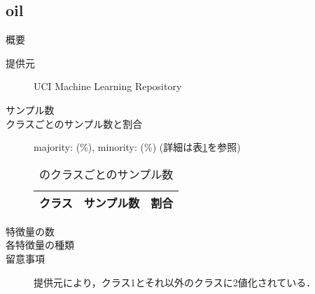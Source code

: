 \subsection{oil}
\begin{description}
    \item[概要] \cite{}
    \item[提供元] UCI Machine Learning Repository
    \item[サンプル数] 
    \item[クラスごとのサンプル数と割合] majority:  (\%), minority:  (\%) (詳細は表\ref{tab:}を参照)

        \begin{table}[htbp]
            \centering
            \caption{のクラスごとのサンプル数}
            \label{tab:}
            \begin{tabular}{lrc} \hline
                \multicolumn{1}{c}{クラス}&
                \multicolumn{1}{c}{サンプル数}&
                \multicolumn{1}{c}{割合}\\
                \hline
                \hline

                \hline
            \end{tabular}
        \end{table}

    \item[特徴量の数] 
    \item[各特徴量の種類] \mbox{}
        
    \item[留意事項] 提供元により，クラス1とそれ以外のクラスに2値化されている．
\end{description}


